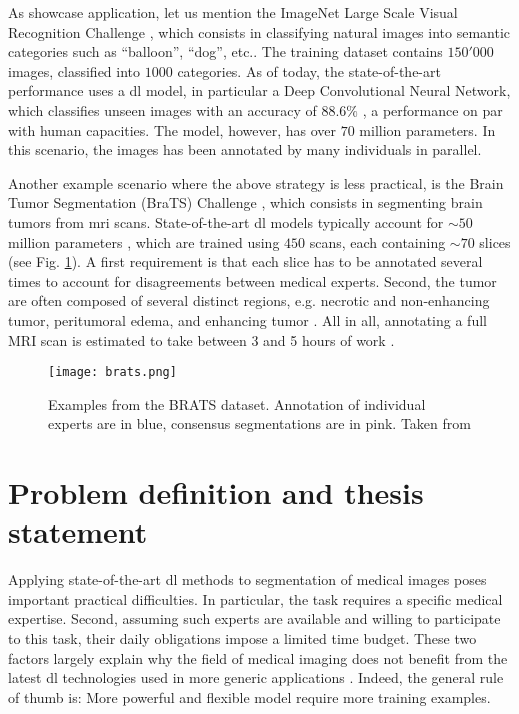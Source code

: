 As showcase application, let us mention the ImageNet Large Scale Visual Recognition Challenge \cite{ILSVRC15}, which consists in classifying natural images into semantic categories such as ``balloon'', ``dog'', etc..
The training dataset contains $150'000$ images, classified into $1000$ categories.
As of today, the state-of-the-art performance uses a \gls{dl} model, in particular a Deep Convolutional Neural Network, which classifies unseen images with an accuracy of $88.6\%$ \cite{tan19}, a performance on par with human capacities.
The model, however, has over $70$ million parameters.
In this scenario, the images has been annotated by many individuals in parallel.

Another example scenario where the above strategy is less practical, is the Brain Tumor Segmentation (BraTS) Challenge \cite{menze15}, which consists in segmenting brain tumors from \gls{mri} scans.
State-of-the-art \gls{dl} models typically account for $\sim 50$ million parameters \cite{chen19}, which are trained using $450$ scans, each containing $\sim 70$ slices (see Fig. \ref{fig:brats}).
A first requirement is that each slice has to be annotated several times to account for disagreements between medical experts.
Second, the tumor are often composed of several distinct regions, e.g. necrotic and non-enhancing tumor, peritumoral edema, and enhancing tumor \cite{akil20}.
All in all, annotating a full MRI scan is estimated to take between 3 and 5 hours of work \cite{kaus01}.

\begin{figure}[!htpb]
  \texttt{[image: brats.png]}
  \caption{Examples from the BRATS dataset. Annotation of individual experts are in blue, consensus segmentations are in pink. Taken from \cite{menze15}}
  \label{fig:brats}
\end{figure}


\section{Problem definition and thesis statement}

Applying state-of-the-art \gls{dl} methods to segmentation of medical images poses important practical difficulties.
In particular, the task requires a specific medical expertise.
Second, assuming such experts are available and willing to participate to this task, their daily obligations impose a limited time budget.
These two factors largely explain why the field of medical imaging does not benefit from the latest \gls{dl} technologies used in more generic applications \cite{orting19}.
Indeed, the general rule of thumb is: More powerful and flexible model require more training examples.

